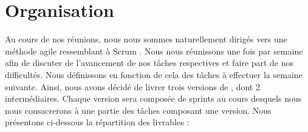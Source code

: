 \section{Organisation}
	\label{sec:livrables}

	Au cours de nos réunions, nous nous sommes naturellement dirigés vers une méthode agile ressemblant à \og Scrum \fg. Nous nous réunissons une fois par semaine afin de discuter de l'avancement de nos tâches respectives et faire part de nos difficultés. Nous définissons en fonction de cela des tâches à effectuer la semaine suivante. Ainsi, nous avons décidé de livrer trois versions de \glasir{}, dont 2 intermédiaires.
	Chaque version sera composée de sprints au cours desquels nous nous consacrerons à une partie des tâches composant une version. %
	Nous présentons ci-dessous la répartition des livrables :
	

